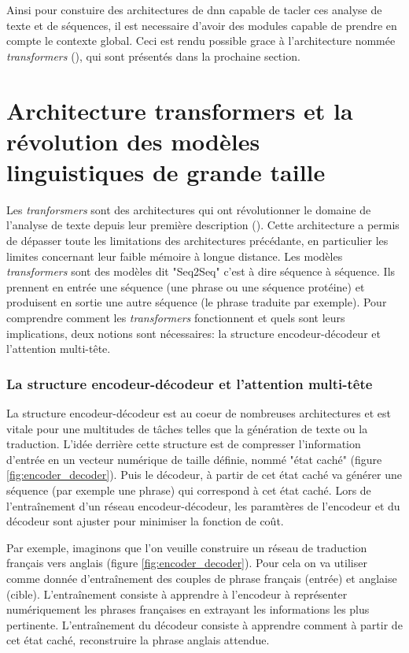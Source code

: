 Ainsi pour constuire des architectures de \gls{dnn} capable de tacler ces analyse de texte et de séquences, il est necessaire d'avoir des modules capable de prendre en compte le contexte global. Ceci est rendu possible grace à l'architecture nommée \textit{transformers} (\cite{vaswani_attention_2017}), qui sont présentés dans la prochaine section.


\section{Architecture transformers et la révolution des modèles linguistiques de grande taille}
Les \textit{tranforsmers} sont des architectures qui ont révolutionner le domaine de l'analyse de texte depuis leur première description (\cite{vaswani_attention_2017}). Cette architecture a permis de dépasser toute les limitations des architectures précédante, en particulier les limites concernant leur faible mémoire à longue distance. Les modèles \textit{transformers} sont des modèles dit "Seq2Seq" c'est à dire séquence à séquence. Ils prennent en entrée une séquence (une phrase ou une séquence protéine) et produisent en sortie une autre séquence (le phrase traduite par exemple). Pour comprendre comment les \textit{transformers} fonctionnent et quels sont leurs implications, deux notions sont nécessaires: la structure encodeur-décodeur et l'attention multi-tête.

\subsubsection{La structure encodeur-décodeur et l'attention multi-tête}
La structure encodeur-décodeur est au coeur de nombreuses architectures et est vitale pour une multitudes de tâches telles que la génération de texte ou la traduction. L'idée derrière cette structure est de compresser l'information d'entrée en un vecteur numérique de taille définie, nommé "état caché" (figure \ref{fig:encoder_decoder}). Puis le décodeur, à partir de cet état caché va générer une séquence (par exemple une phrase) qui correspond à cet état caché. Lors de l'entraînement d'un réseau encodeur-décodeur, les paramtères de l'encodeur et du décodeur sont ajuster pour minimiser la fonction de coût. 

Par exemple, imaginons que l'on veuille construire un réseau de traduction français vers anglais (figure \ref{fig:encoder_decoder}). Pour cela on va utiliser comme donnée d'entraînement des couples de phrase français (entrée) et anglaise (cible). L'entraînement consiste à apprendre à l'encodeur à représenter numériquement les phrases françaises en extrayant les informations les plus pertinente. L'entraînement du décodeur consiste à apprendre comment à partir de cet état caché, reconstruire la phrase anglais attendue.

